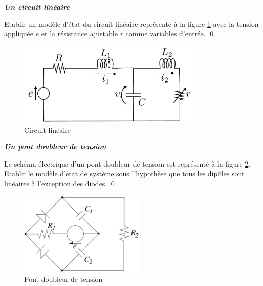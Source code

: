 \begin{exercice} {\bf \em Un circuit linéaire}

Etablir un modèle d'état du circuit linéaire représenté à la figure \ref{fig:circuitlin} avec la tension appliquée $e$ et la résistance ajustable $r$ comme variables d'entrée. \qed
 \begin{figure}[htbp]
\begin{center}
\includegraphics[height=4cm]{circuitlin}
\caption{Circuit linéaire}
\label{fig:circuitlin}
\end{center}
\end{figure}

\end{exercice}
\vv

\begin{exercice} {\bf \em Un pont doubleur de tension}

Le schéma électrique d'un pont doubleur de tension est représenté à la figure
\ref{fig:pont}. Etablir le modèle d'état de système sous l'hypothèse que tous 
les dip{ô}les sont linéaires à l'exception des diodes. \qed
\begin{figure}[htbp]
\begin{center}
\includegraphics[height=4cm]{pont}
\caption{Pont doubleur de tension}
\label{fig:pont}
\end{center}
\end{figure}
\end{exercice}
\vv

